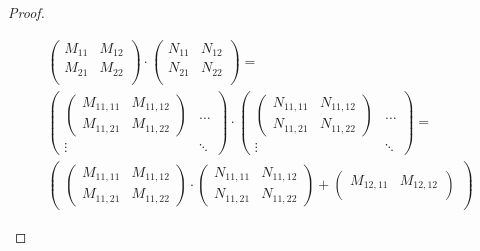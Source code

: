\documentclass[a4paper]{article}
\begin{document}
\begin{proof}
\begin{description}
            \setlength{\jot}{10pt}
            \begin{gather*}
                \begin{pmatrix}
                    M_{11} & M_{12} \\
                    M_{21} & M_{22} \\
                \end{pmatrix} \cdot
                \begin{pmatrix}
                    N_{11} & N_{12} \\
                    N_{21} & N_{22} \\
                \end{pmatrix} = \\
                \begin{pmatrix}
                    \begin{pmatrix}
                        M_{11,11} & M_{11,12} \\
                        M_{11,21} & M_{11,22}
                    \end{pmatrix} & \dots \\
                    \vdots & \ddots
                \end{pmatrix} \cdot
                \begin{pmatrix}
                    \begin{pmatrix}
                        N_{11,11} & N_{11,12} \\
                        N_{11,21} & N_{11,22}
                    \end{pmatrix} & \dots \\
                    \vdots & \ddots
                \end{pmatrix} = \\
                \begin{pmatrix}
                    \begin{pmatrix}
                        M_{11,11} & M_{11,12} \\
                        M_{11,21} & M_{11,22}
                    \end{pmatrix} \cdot
                    \begin{pmatrix}
                        N_{11,11} & N_{11,12} \\
                        N_{11,21} & N_{11,22}
                    \end{pmatrix} +
                    \begin{pmatrix}
                        M_{12,11} & M_{12,12} \\

\end{pmatrix}
\end{pmatrix}
\end{gather*}
\end{description}
\end{proof}
\end{document}
